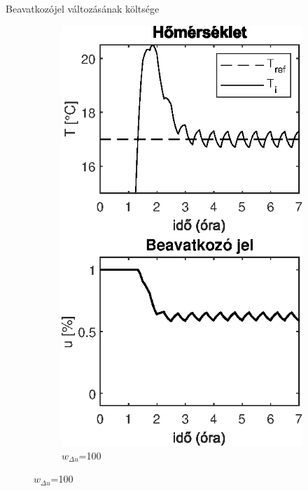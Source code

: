 \documentclass[14pt,handout]{beamer}
\begin{document}
\begin{frame}{Beavatkozójel változásának költsége}


\begin{figure}
\begin{subfigure}[t]{0.35\textwidth}
	\centering
	\includegraphics[width=\textwidth]{picture/mpc-wdu-100.eps}
	\caption{$w_{\Delta u}$=100}	
\end{subfigure}

\end{figure}
\end{frame}
\end{document}
